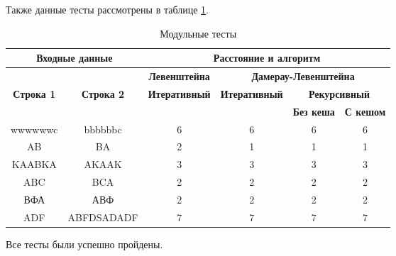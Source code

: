 Также данные тесты рассмотрены в таблице \ref{t:unit_tests}.

\begin{table}[!ht]
	
	\begin{center}
		\small
		\begin{threeparttable}
		\caption{Модульные тесты}
        \label{t:unit_tests}
		\begin{tabular}{|c|c|c|c|c|c|}
			\hline
			\multicolumn{2}{|c|}{\bfseries Входные данные}
			& \multicolumn{4}{c|}{\bfseries Расстояние и алгоритм} \\ 
			\hline 
			&
			& \multicolumn{1}{c|}{\bfseries Левенштейна} 
			& \multicolumn{3}{c|}{\bfseries Дамерау-Левенштейна} \\ \cline{3-6}
			
			\bfseries Строка 1 & \bfseries Строка 2 & \bfseries Итеративный & \bfseries Итеративный
			
			& \multicolumn{2}{c|}{\bfseries Рекурсивный} \\ \cline{5-6}
			& & & & \bfseries Без кеша & \bfseries С кешом \\
			\hline
			wwwwwwc & bbbbbbc & 6 & 6 & 6 & 6 \\
			\hline
			AB & BA & 2 & 1 & 1 & 1 \\
			\hline
			KAABKA & AKAAK & 3 & 3 & 3 & 3 \\
			\hline
			ABC & BCA & 2 & 2 & 2 & 2 \\
			\hline
			ВФА & АВФ & 2 & 2 & 2 & 2 \\
			\hline
			ADF & ABFDSADADF & 7 & 7 & 7 & 7 \\
			\hline
		\end{tabular}	
		\end{threeparttable}
	\end{center}
\end{table}

Все тесты были успешно пройдены.